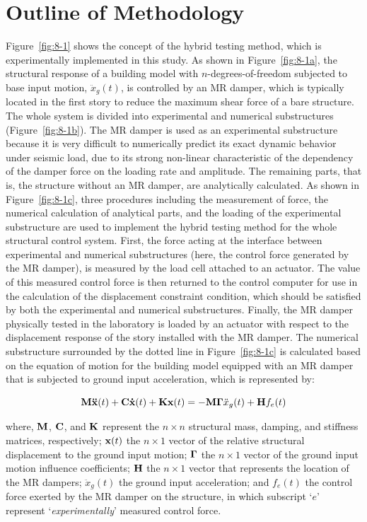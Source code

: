 \section{Outline of Methodology}
Figure~\ref{fig:8-1} shows the concept of the hybrid testing method, which is experimentally implemented in this study. As shown in Figure~\ref{fig:8-1a}, the structural response of a building model with $n$-degrees-of-freedom subjected to base input motion, $\ddot{x}_{g}(t)$, is controlled by an MR damper, which is typically located in the first story to reduce the maximum shear force of a bare structure. The whole system is divided into experimental and numerical substructures (Figure~\ref{fig:8-1b}). The MR damper is used as an experimental substructure because it is very difficult to numerically predict its exact dynamic behavior under seismic load, due to its strong non-linear characteristic of the dependency of the damper force on the loading rate and amplitude. The remaining parts, that is, the structure without an MR damper, are analytically calculated. As shown in Figure~\ref{fig:8-1c}, three procedures including the measurement of force, the numerical calculation of analytical parts, and the loading of the experimental substructure are used to implement the hybrid testing method for the whole structural control system\citep{blakeborough2001development}. First, the force acting at the interface between experimental and numerical substructures (here, the control force generated by the MR damper), is measured by the load cell attached to an actuator. The value of this measured control force is then returned to the control computer for use in the calculation of the displacement constraint condition, which should be satisfied by both the experimental and numerical substructures. Finally, the MR damper physically tested in the laboratory is loaded by an actuator with respect to the displacement response of the story installed with the MR damper. The numerical substructure surrounded by the dotted line in Figure~\ref{fig:8-1c} is calculated based on the equation of motion for the building model equipped with an MR damper that is subjected to ground input acceleration, which is represented by:

\begin{equation}\label{eq:8-1}
\mathbf{M}\mathbf{\ddot{x}}(t)+\mathbf{C}\mathbf{\dot{x}}(t)+\mathbf{K}\mathbf{x}(t) = -\mathbf{M}\mathbf{\Gamma}\ddot{x}_{g}(t)+\mathbf{H}f_{e}(t)
\end{equation}

where, $\mathbf{M}$, $\mathbf{C}$, and $\mathbf{K}$ represent the $n \times n$ structural mass, damping, and stiffness matrices, respectively; $\mathbf{x}(t)$ the $n\times 1$ vector of the relative structural displacement to the ground input motion; $\mathbf{\Gamma}$ the $n\times1$ vector of the ground input motion influence coefficients; $\mathbf{H}$ the $n \times 1$ vector that represents the location of the MR dampers; $\ddot{x}_{g}(t)$ the ground input acceleration; and $f_{e}(t)$ the control force exerted by the MR damper on the structure, in which subscript `$e$' represent `\textit{experimentally}' measured control force.

